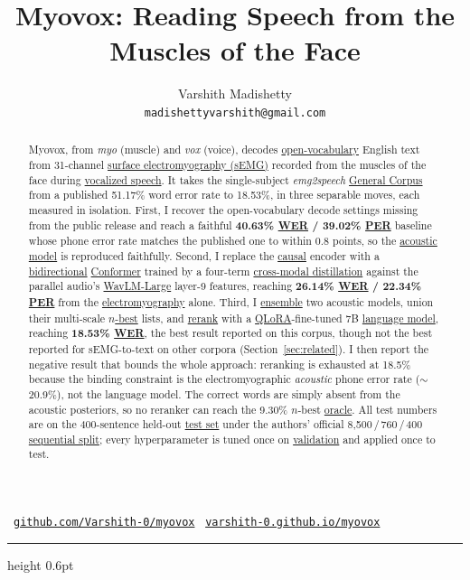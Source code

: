 \documentclass{article}
\title{Myovox: Reading Speech from the Muscles of the Face}
\author{%
  Varshith Madishetty\\
  \texttt{madishettyvarshith@gmail.com}%
}
\DeclareRobustCommand{\glref}[2]{\hyperlink{gl:#1}{\textcolor{glosslink}{#2}}}
\DeclareRobustCommand{\wer}{\glref{wer}{WER}}
\DeclareRobustCommand{\per}{\glref{per}{PER}}
\begin{document}
\maketitle

\vspace{-6pt}
\begin{center}
\small
\faGithub~\href{https://github.com/Varshith-0/myovox}{\texttt{github.com/Varshith-0/myovox}}\qquad
\faGlobe~\href{https://varshith-0.github.io/myovox/}{\texttt{varshith-0.github.io/myovox}}
\end{center}
\vspace{2pt}
{\color{rulegray}\hrule height 0.6pt}
\vspace{6pt}

\begin{abstract}
Myovox, from \emph{myo} (muscle) and \emph{vox} (voice), decodes
\glref{openvocab}{open-vocabulary} English text from 31-channel
\glref{semg}{surface electromyography (sEMG)} recorded from the muscles of the face during
\glref{vocalized}{vocalized speech}. It takes the single-subject \emph{emg2speech}
\glref{corpus}{General Corpus} from a published 51.17\% word error rate to 18.53\%, in three
separable moves, each measured in isolation.
First, I recover the open-vocabulary decode settings missing from the public release and
reach a faithful \textbf{40.63\% \wer{} / 39.02\% \per{}} baseline whose phone error rate matches
the published one to within 0.8 points, so the \glref{am}{acoustic model} is reproduced faithfully.
Second, I replace the \glref{causal}{causal} encoder with a \glref{bidir}{bidirectional}
\glref{conformer}{Conformer} trained by a four-term \glref{crossmodal}{cross-modal distillation}
against the parallel audio's \glref{wavlm}{WavLM-Large} layer-9 features, reaching \textbf{26.14\%
\wer{} / 22.34\% \per{}} from the \glref{emg}{electromyography} alone. Third, I
\glref{ensemble}{ensemble} two acoustic models, union their multi-scale \glref{nbest}{$n$-best}
lists, and \glref{rerank}{rerank} with a \glref{qlora}{QLoRA}-fine-tuned 7B
\glref{lm}{language model}, reaching \textbf{18.53\% \wer{}}, the best result reported on this
corpus, though not the best reported for sEMG-to-text on other corpora (Section~\ref{sec:related}).
I then report the negative result that bounds the whole approach: reranking is exhausted at 18.5\%
because the binding constraint is the electromyographic \emph{acoustic} phone error rate
($\sim$20.9\%), not the language model. The correct words are simply absent from the acoustic
posteriors, so no reranker can reach the 9.30\% $n$-best \glref{oracle}{oracle}. All test numbers
are on the 400-sentence held-out \glref{test}{test set} under the authors' official
8{,}500\,/\,760\,/\,400 \glref{split}{sequential split}; every hyperparameter is tuned once on
\glref{val}{validation} and applied once to test.
\end{abstract}
\end{document}
